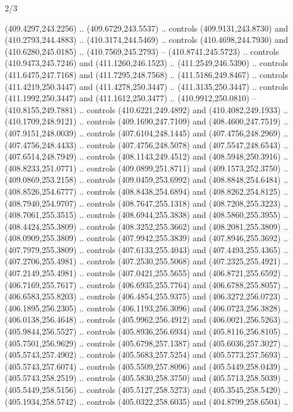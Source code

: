 \begin{flagdescription}{2/3}
\begin{scope}[xshift=0.5\flaglength,yshift=0.5\flagwidth,scale=\flagwidth/495.65]
\begin{scope}[y=0.8pt, x=0.8pt, yscale=-1,shift={(-463.76,-309.78)}]
  (409.4297,243.2256) .. (409.6729,243.5537) .. controls (409.9131,243.8730) and
  (410.2793,244.4883) .. (410.3174,244.5469) .. controls (410.4698,244.7930) and
  (410.6280,245.0185) .. (410.7569,245.2793) -- (410.8741,245.5723) .. controls
  (410.9473,245.7246) and (411.1260,246.1523) .. (411.2549,246.5390) .. controls
  (411.6475,247.7168) and (411.7295,248.7568) .. (411.5186,249.8467) .. controls
  (411.4219,250.3447) and (411.4278,250.3447) .. (411.3135,250.3447) .. controls
  (411.1992,250.3447) and (411.1612,250.3477) .. (410.9912,250.0810) --
  (410.8155,249.7881) .. controls (410.6221,249.4892) and (410.4082,249.1933) ..
  (410.1709,248.9121) .. controls (409.1690,247.7109) and (408.4600,247.7519) ..
  (407.9151,248.0039) .. controls (407.6104,248.1445) and (407.4756,248.2969) ..
  (407.4756,248.4433) .. controls (407.4756,248.5078) and (407.5547,248.6543) ..
  (407.6514,248.7949) .. controls (408.1143,249.4512) and (408.5948,250.3916) ..
  (408.8233,251.0771) .. controls (409.0899,251.8711) and (409.1573,252.3750) ..
  (409.0869,253.2158) .. controls (409.0459,253.6992) and (408.8848,254.6484) ..
  (408.8526,254.6777) .. controls (408.8438,254.6894) and (408.8262,254.8125) ..
  (408.7940,254.9707) .. controls (408.7647,255.1318) and (408.7208,255.3223) ..
  (408.7061,255.3515) .. controls (408.6944,255.3838) and (408.5860,255.3955) ..
  (408.4424,255.3809) .. controls (408.3252,255.3662) and (408.2081,255.3809) ..
  (408.0909,255.3809) .. controls (407.9942,255.3839) and (407.8946,255.3692) ..
  (407.7979,255.3809) .. controls (407.6133,255.4043) and (407.4493,255.4365) ..
  (407.2706,255.4981) .. controls (407.2530,255.5068) and (407.2325,255.4921) ..
  (407.2149,255.4981) .. controls (407.0421,255.5655) and (406.8721,255.6592) ..
  (406.7169,255.7617) .. controls (406.6935,255.7764) and (406.6788,255.8057) ..
  (406.6583,255.8203) .. controls (406.4854,255.9375) and (406.3272,256.0723) ..
  (406.1895,256.2305) .. controls (406.1193,256.3096) and (406.0723,256.3828) ..
  (406.0138,256.4648) .. controls (405.9962,256.4912) and (406.0021,256.5263) ..
  (405.9844,256.5527) .. controls (405.8936,256.6934) and (405.8116,256.8105) ..
  (405.7501,256.9629) .. controls (405.6798,257.1387) and (405.6036,257.3027) ..
  (405.5743,257.4902) .. controls (405.5683,257.5254) and (405.5773,257.5693) ..
  (405.5743,257.6074) .. controls (405.5509,257.8096) and (405.5449,258.0439) ..
  (405.5743,258.2519) .. controls (405.5830,258.3750) and (405.5713,258.5039) ..
  (405.5449,258.5156) .. controls (405.5127,258.5273) and (405.3545,258.5420) ..
  (405.1934,258.5742) .. controls (405.0322,258.6035) and (404.8799,258.6504) ..

\end{scope}
\end{scope}
\end{flagdescription}
